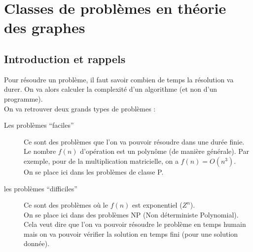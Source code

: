 \section{Classes de problèmes en théorie des graphes}
\subsection{Introduction et rappels}
Pour résoudre un problème, il faut savoir combien de temps la résolution va durer. On va alors calculer la complexité d'un algorithme (et non d'un programme).\\
On va retrouver deux grands types de problèmes :
\begin{description}
 \item[Les problèmes \enquote{faciles}] Ce sont des problèmes que l'on va pouvoir résoudre dans une durée finie. Le nombre $f(n)$ d'opération est un polynôme (de manière générale). Par exemple, pour de la multiplication matricielle, on a $f(n) = O(n^3)$.\\ On se place ici dans les problèmes de classe P.
 \item[les problèmes \enquote{difficiles}] Ce sont des problèmes où le $f(n)$ est exponentiel ($Z^n$).\\On se place ici dans des problèmes NP (Non déterministe Polynomial). Cela veut dire que l'on va pouvoir résoudre le problème en temps humain mais on va pouvoir vérifier la solution en temps fini (pour une solution donnée).
\end{description}

